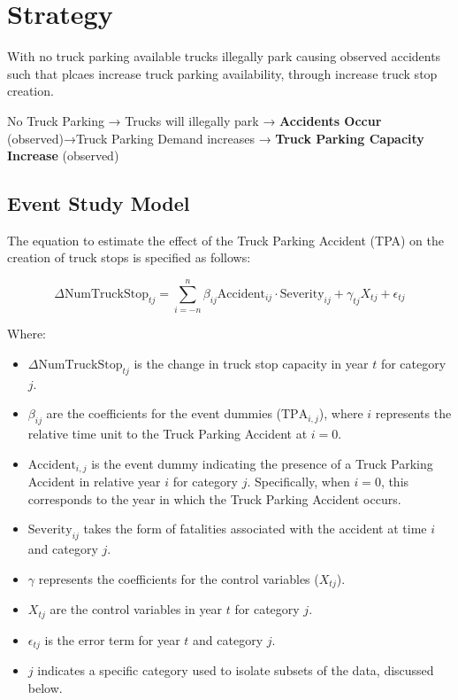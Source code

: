 \documentclass[
  12pt]{article}
\begin{document}
\hypertarget{strategy}{%
\section{\texorpdfstring{\textbf{Strategy}}{Strategy}}\label{strategy}}

With no truck parking available trucks illegally park causing observed
accidents such that plcaes increase truck parking availability, through
increase truck stop creation.

No Truck Parking → Trucks will illegally park → \textbf{Accidents Occur}
(observed)→Truck Parking Demand increases → \textbf{Truck Parking
Capacity Increase} (observed)

\hypertarget{event-study-model}{%
\subsection{Event Study Model}\label{event-study-model}}

The equation to estimate the effect of the Truck Parking Accident (TPA)
on the creation of truck stops is specified as follows:

\[
\Delta \text{NumTruckStop}_{tj} = \sum_{i=-n}^{n} \beta_{ij} \text{Accident}_{ij}\cdot \text{Severity}_{ij} + \gamma_{tj} X_{tj} + \epsilon_{tj}
\]

Where:

\begin{itemize}
\item
  \(\Delta\text{NumTruckStop}_{tj}\) is the change in truck stop
  capacity in year \(t\) for category \(j\).
\item
  \(\beta_{ij}\) are the coefficients for the event dummies
  (\(\text{TPA}_{i,j}\)), where \(i\) represents the relative time unit
  to the Truck Parking Accident at \(i = 0\).
\item
  \(\text{Accident}_{i,j}\) is the event dummy indicating the presence
  of a Truck Parking Accident in relative year \(i\) for category \(j\).
  Specifically, when \(i = 0\), this corresponds to the year in which
  the Truck Parking Accident occurs.
\item
  \(\text{Severity}_{ij}\) takes the form of fatalities associated with
  the accident at time \(i\) and category \(j\).
\item
  \(\gamma\) represents the coefficients for the control variables
  (\(X_{tj}\)).
\item
  \(X_{tj}\) are the control variables in year \(t\) for category \(j\).
\item
  \(\epsilon_{tj}\) is the error term for year \(t\) and category \(j\).
\item
  \(j\) indicates a specific category used to isolate subsets of the
  data, discussed below.
\end{itemize}
\end{document}
